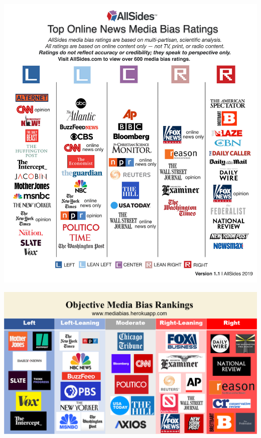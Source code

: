 \documentclass[12pt]{article}
\theoremstyle{example}
\theoremstyle{defn}
\begin{document}
\hspace*{\fill}
\includegraphics[scale=0.1]{pb494mdp.png}
\hspace*{\fill}

\clearpage

\vfill

\hspace*{\fill}
\includegraphics[scale=0.3]{mediabiaschart.png}
\hspace*{\fill}

\vspace*{\fill}
\end{document}

